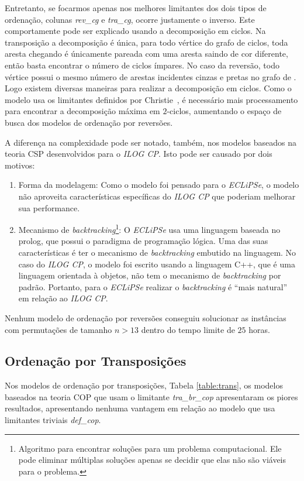 Entretanto, se focarmos apenas nos melhores limitantes dos dois tipos
de ordenação, colunas \textit{rev\_cg} e \textit{tra\_cg}, ocorre
justamente o inverso. Este comportamente pode ser explicado usando a
decomposição em ciclos. Na transposição a decomposição é única, para
todo vértice do grafo de ciclos, toda aresta chegando é únicamente
pareada com uma aresta saindo de cor diferente, então basta encontrar
o número de ciclos ímpares. No caso da reversão, todo vértice possui o
mesmo número de arestas incidentes cinzas e pretas no grafo
de \bkp{}. Logo existem diversas maneiras para realizar a decomposição
em ciclos. Como o modelo usa os limitantes definidos por
Christie~\cite{Christie*1998}, é necessário mais processamento
para encontrar a decomposição máxima em $2$-ciclos, aumentando o
espaço de busca dos modelos de ordenação por reversões.

A diferença na complexidade pode ser notado, também, nos modelos
baseados na teoria CSP desenvolvidos para o \textit{ILOG CP}. Isto
pode ser causado por dois motivos:
\begin{enumerate}

  \item{Forma da modelagem: Como o modelo foi pensado para
  o \textit{ECLiPSe}, o modelo não aproveita características
  específicas do \textit{ILOG CP} que poderiam melhorar sua
  performance.}

  \item{Mecanismo de \textit{backtracking}\footnote{Algoritmo para
  encontrar soluções para um problema computacional. Ele pode eliminar
  múltiplas soluções apenas se decidir que elas não são viáveis para o
  problema.}: O \textit{ECLiPSe} usa uma linguagem baseada no prolog,
  que possui o paradigma de programação lógica. Uma das suas
  características é ter o mecanismo de \textit{backtracking} embutido
  na linguagem. No caso do \textit{ILOG CP}, o modelo foi escrito
  usando a linguagem C++, que é uma linguagem orientada à objetos, não
  tem o mecanismo de \textit{backtracking} por padrão. Portanto, para
  o \textit{ECLiPSe} realizar o \textit{backtracking} é ``mais
  natural'' em relação ao \textit{ILOG CP}.}

\end{enumerate}

Nenhum modelo de ordenação por reversões conseguiu solucionar as
instâncias com permutações de tamanho $n > 13$ dentro do tempo limite
de $25$ horas.



\subsection{Ordenação por Transposições}
\label{subsec:analise_tra}
Nos modelos de ordenação por transposições, Tabela \ref{table:trans},
os modelos baseados na teoria COP que usam o
limitante \textit{tra\_br\_cop} apresentaram os piores resultados,
apresentando nenhuma vantagem em relação ao modelo que usa limitantes
triviais \textit{def\_cop}.

